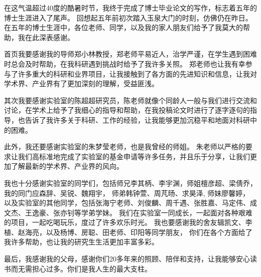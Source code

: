 \cleardoublepage
{}
在这气温超过40度的酷暑时节，我终于完成了博士毕业论文的写作，标志着五年的博士生涯进入了尾声。
%
回想起五年前初次踏入玉泉大门的时刻，仿佛仍在昨日。
%
在五年的博士生涯中，各位老师、同学，以及我的家人朋友们给予了我莫大的帮助，我在此深表感谢。

首页我要感谢我的导师郑小林教授，郑老师平易近人，治学严谨，在学生遇到困难时总会及时帮助，在我科研遇到挑战时给予了我许多关照。
%
郑老师也让我有幸参与了许多重大的科研和业界项目，让我接触到了各方面的先进知识和信息，让我对学术界、产业界有了更加深刻的理解，受益匪浅。

其次我要感谢实验室的陈超超研究员，陈老师就像个同龄人一般与我们进行交流和讨论，在学术上给予了我细心的指导和帮助，在我投稿论文时进行了逐字逐句的指导，也告诉了我许多关于科研、工作的经验，让我能够更加沉稳平和地面对科研中的困难。

此外，我还要感谢实验室的朱梦莹老师，也是我曾经的师姐。
%
朱老师以严格的要求让我们高标准地完成了实验室的基金申请等许多任务，并且乐于分享，让我们更加了解最新的学术界、产业界的风向。

我也十分感谢实验室的同学们，包括师兄李其柄、李宇渊，师姐檀彦超、梁倩乔，
%
我的同门应森辞、吴锐、魏翔宇，
%
师弟韩钟萱、周芃旸、求昊泽,
%
师妹廖馨婷，
%
以及实验室的其他同学，包括张海宁老师、刘俊麟、周千遇、张胜嘉、马定伟、成文杰、王逸豪、张亦钊等学弟学妹。
我们在实验室一同成长，一起面对各种艰难的项目，一起吃喝玩乐，度过了许多欢乐时光。
%
我也要感谢我的舍友辑凯文、李植、赵海亮，以及杨博、房聪、田老师、印阳等同学朋友，
你们在各个方面给了我许多帮助，也让我的研究生生活更加丰富多彩。

最后，我感谢我的父母，感谢你们20多年来的照顾、陪伴和支持，让我能够安心读书而无需担心过多。你们是我人生的最大支柱。

\vspace{20pt}

